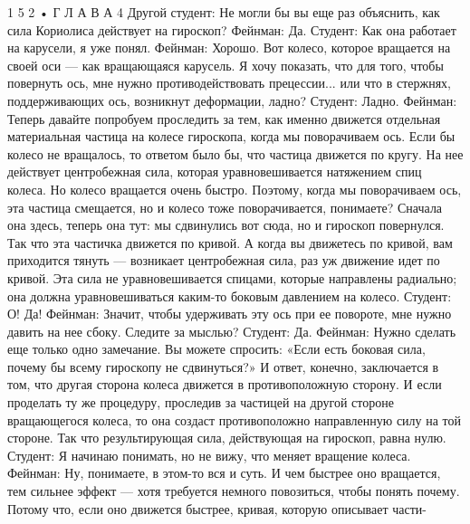 \documentclass[10pt,oneside]{article}
\begin{document}
1 5 2 • Г Л А В А  4 Другой студент: Не могли бы вы еще раз объяснить, как сила Кориолиса действует на гироскоп? Фейнман: Да. Студент: Как она работает на карусели, я уже понял. Фейнман: Хорошо. Вот колесо, которое вращается на своей оси --- как вращающаяся карусель. Я хочу показать, что для того, чтобы повернуть ось, мне нужно противодействовать прецессии... или что в стержнях, поддерживающих ось, возникнут деформации, ладно? Студент: Ладно. Фейнман: Теперь давайте попробуем проследить за тем, как именно движется отдельная материальная частица на колесе гироскопа, когда мы поворачиваем ось. Если бы колесо не вращалось, то ответом было бы, что частица движется по кругу. На нее действует центробежная сила, которая уравновешивается натяжением спиц колеса. Но колесо вращается очень быстро. Поэтому, когда мы поворачиваем ось, эта частица смещается, но и колесо тоже поворачивается, понимаете? Сначала она здесь, теперь она тут: мы сдвинулись вот сюда, но и гироскоп повернулся. Так что эта частичка движется по кривой. А когда вы движетесь по кривой, вам приходится тянуть --- возникает центробежная сила, раз уж движение идет по кривой. Эта сила не уравновешивается спицами, которые направлены радиально; она должна уравновешиваться каким-то боковым давлением на колесо. Студент: О! Да! Фейнман: Значит, чтобы удерживать эту ось при ее повороте, мне нужно давить на нее сбоку. Следите за мыслью? Студент: Да. Фейнман: Нужно сделать еще только одно замечание. Вы можете спросить: «Если есть боковая сила, почему бы всему гироскопу не сдвинуться?» И ответ, конечно, заключается в том, что другая сторона колеса движется в противоположную сторону. И если проделать ту же процедуру, проследив за частицей на другой стороне вращающегося колеса, то она создаст противоположно направленную силу на той стороне. Так что результирующая сила, действующая на гироскоп, равна нулю. Студент: Я начинаю понимать, но не вижу, что меняет вращение колеса. Фейнман: Ну, понимаете, в этом-то вся и суть. И чем быстрее оно вращается, тем сильнее эффект --- хотя требуется немного повозиться, чтобы понять почему. Потому что, если оно движется быстрее, кривая, которую описывает части-\par
\end{document}

